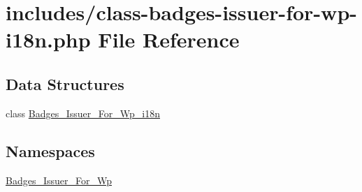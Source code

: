 \hypertarget{class-badges-issuer-for-wp-i18n_8php}{}\section{includes/class-\/badges-\/issuer-\/for-\/wp-\/i18n.php File Reference}
\label{class-badges-issuer-for-wp-i18n_8php}
\subsection*{Data Structures}
\begin{DoxyCompactItemize}
\item 
class \hyperlink{class_badges___issuer___for___wp__i18n}{Badges\+\_\+\+Issuer\+\_\+\+For\+\_\+\+Wp\+\_\+i18n}
\end{DoxyCompactItemize}
\subsection*{Namespaces}
\begin{DoxyCompactItemize}
\item 
 \hyperlink{namespace_badges___issuer___for___wp}{Badges\+\_\+\+Issuer\+\_\+\+For\+\_\+\+Wp}
\end{DoxyCompactItemize}
